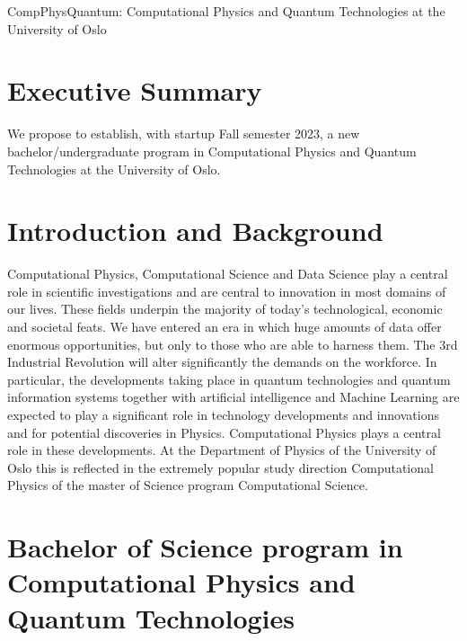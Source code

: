 \documentclass[oneside,final,10pt]{article}
\begin{document}
\thispagestyle{empty}

\begin{center}
{\LARGE\bf
\begin{spacing}{1.25}
CompPhysQuantum: Computational Physics and Quantum Technologies  at the University of Oslo
\end{spacing}
}
\end{center}



\vspace{1cm}


\section*{Executive Summary}

We propose to establish, with startup Fall semester 2023, a new bachelor/undergraduate program in Computational Physics and Quantum Technologies  at the University of Oslo. 

\section*{Introduction and Background}

Computational Physics, Computational Science  and Data Science play a central role in scientific investigations and are central to innovation in most domains of our lives. These fields underpin the majority of today's technological, economic and societal feats. We have entered an era in which huge amounts of data offer enormous opportunities, but only to those who are able to harness them. The 3rd Industrial Revolution will alter significantly the demands on the workforce. In particular, the developments taking place in quantum technologies and quantum information systems together with artificial intelligence and Machine Learning are expected to play a significant role in technology developments and innovations and for potential discoveries in Physics.
Computational Physics plays a central role in these developments. At the Department of Physics of the University of Oslo this is reflected in the extremely popular study direction Computational Physics of the master of Science program Computational Science. 




\section*{Bachelor of Science program in Computational Physics and Quantum Technologies}
\end{document}
